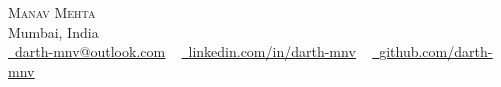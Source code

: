 \documentclass[letterpaper,11pt]{article}
\newcommand{\resumeSubHeadingListStart}{\begin{itemize}[leftmargin=0.0in, label={}]}
\newcommand{\resumeSubHeadingListEnd}{\end{itemize}}
\begin{document}

\begin{center}
  {\Huge \scshape Manav Mehta} \\ \vspace{1pt}
  Mumbai, India \\ \vspace{1pt}
  \href{mailto:darth-mnv@outlook.com}{\raisebox{-0.2\height}\faEnvelope\  \underline{darth-mnv@outlook.com}} ~
  \href{https://www.linkedin.com/in/darth-mnv/}{\raisebox{-0.2\height}\faLinkedin\ \underline{linkedin.com/in/darth-mnv}}  ~
  \href{https://github.com/darth-mnv}{\raisebox{-0.2\height}\faGithub\ \underline{github.com/darth-mnv}}
  \vspace{-8pt}
\end{center}

\end{document}
